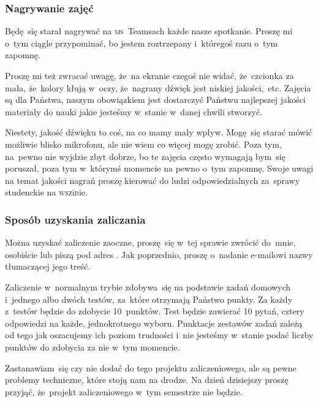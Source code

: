 \documentclass[10pt,t]{beamer}
\begin{document}
\begin{frame}
  \frametitle{Nagrywanie zajęć}


  Będę~się starał nagrywać na \textsc{ms}~Teamsach każde nasze spotkanie.
  Proszę mi o~tym ciągle przypominać, bo jestem roztrzepany i~któregoś
  razu o~tym zapomnę.

  Proszę mi też zwracać uwagę, że~na ekranie czegoś nie widać,
  że~czcionka za mała, że~kolory kłują w~oczy, że~nagrany dźwięk
  jest niskiej jakości,~etc. Zajęcia są dla Państwa, naszym obowiązkiem jest
  dostarczyć Państwu najlepszej jakości materiały do nauki jakie jesteśmy
  w~stanie w~danej chwili stworzyć.

  Niestety, jakość dźwięku to coś, na co mamy mały wpływ. Mogę~się starać
  mówić możliwie blisko mikrofonu, ale nie wiem co więcej mogę zrobić.
  Poza tym, na~pewno nie wyjdzie zbyt dobrze, bo te zajęcia często wymagają
  bym~się poruszał, poza tym w~którymś momencie na pewno o~tym zapomnę.
  Swoje uwagi na temat jakości nagrań proszę kierować do ludzi
  odpowiedzialnych za~sprawy studenckie na \textsc{wsz}i\textsc{b}ie.

\end{frame}





\begin{frame}
  \frametitle{Sposób uzyskania zaliczania}


  Można uzyskać zaliczenie zaoczne, proszę~się w~tej sprawie zwrócić
  do~mnie, osobiście lub piszą pod adres \email. Jak poprzednio, proszę
  o~nadanie e-mailowi nazwy tłumaczącej jego treść.

  Zaliczenie w~normalnym trybie zdobywa~się na podstawie zadań domowych
  i~jednego albo dwóch testów, za~które otrzymają Państwo punkty. Za każdy
  z~testów będzie do zdobycie 10~punktów. Test będzie zawierać 10 pytań,
  cztery odpowiedzi na każde, jednokrotnego wyboru. Punktacje zestawów zadań
  zależą od tego jak oszacujemy ich poziom trudności i~nie jesteśmy
  w~stanie podać liczby punktów do zdobycia za nie w~tym momencie.

  Zastanawiam~się czy nie dodać do tego projektu zaliczeniowego, ale są
  pewne problemy techniczne, które stoją nam na drodze. Na dzień dzisiejszy
  proszę przyjąć, że~projekt zaliczeniowego w~tym semestrze nie będzie.

\end{frame}
\end{document}
